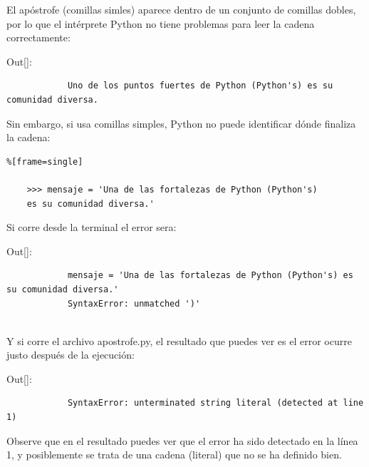 El apóstrofe (comillas simles) aparece dentro de un conjunto de comillas dobles, por lo que el intérprete Python no tiene problemas para leer la cadena correctamente:\\

{\ttfamily\scriptsize\scriptsize 
	\hspace{-0.65cm}Out[]:\vspace{-0.15cm}	
	{\color{blue} 	
		\begin{verbatim}		
			Uno de los puntos fuertes de Python (Python's) es su comunidad diversa.
		\end{verbatim}
}} 

Sin embargo, si usa comillas simples, Python no puede identificar dónde  finaliza la cadena:

\begin{lstlisting}%[frame=single]
	
	>>> mensaje = 'Una de las fortalezas de Python (Python's) 
	es su comunidad diversa.'
\end{lstlisting}

Si corre desde la terminal el error sera:\\

{\ttfamily\scriptsize\scriptsize 
	\hspace{-0.65cm}Out[]:\vspace{-0.15cm}	
	{\color{red} 	
		\begin{verbatim}		
			mensaje = 'Una de las fortalezas de Python (Python's) es su comunidad diversa.'
			SyntaxError: unmatched ')'
		\end{verbatim}
}}


\\

Y si corre el archivo  {\ttfamily apostrofe.py}, el resultado que puedes ver es el error ocurre justo después de la ejecución: \\

{\ttfamily\scriptsize\scriptsize 
	\hspace{-0.65cm}Out[]:\vspace{-0.15cm}	
	{\color{blue} 	
		\begin{verbatim}		
			SyntaxError: unterminated string literal (detected at line 1)
		\end{verbatim}
}} 

Observe que en el resultado puedes ver que el error ha sido detectado en la línea 1, y posiblemente se trata de una cadena (literal) que no  se ha definido bien. 


